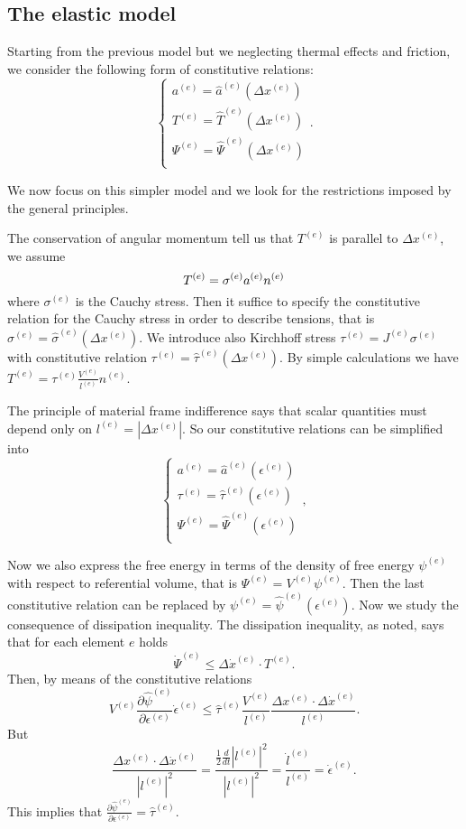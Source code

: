 \documentclass[a4paper,11pt]{article}
\theoremstyle{definition}
\newcommand{\dind}[2]{\frac{\partial #1}{\partial #2}}
\begin{document}
\subsection*{The elastic model}

Starting from the previous model but we neglecting thermal effects and friction, we consider the following form of constitutive relations:
\[
\begin{cases}
a^{(e)}=\hat{a}^{(e)}(\Delta x^{(e)}) \\
T^{(e)}=\hat{T}^{(e)}(\Delta x^{(e)}) \\
\Psi^{(e)}=\hat{\Psi}^{(e)}(\Delta x^{(e)}) \\
\end{cases}.
\]

We now focus on this simpler model and we look for the restrictions imposed by the general principles. 

The conservation of angular momentum tell us that $T^{(e)}$ is parallel to $\Delta x^{(e)}$, we assume
\[
T^{(e)}=\sigma^{(e)}a^{(e)}n^{(e)} \\
\]
where $\sigma^{(e)}$ is the Cauchy stress. Then it suffice to specify the constitutive relation for the Cauchy stress in order to describe tensions, that is $\sigma^{(e)}=\hat{\sigma}^{(e)}(\Delta x^{(e)})$. We introduce also Kirchhoff stress $\tau^{(e)}=J^{(e)}\sigma^{(e)}$ with constitutive relation $\tau^{(e)}=\hat{\tau}^{(e)}(\Delta x^{(e)})$. By simple calculations we have $T^{(e)}=\tau^{(e)}\frac{V^{(e)}}{l^{(e)}}n^{(e)}$.

The principle of material frame indifference says that scalar quantities must depend only on $l^{(e)}=|\Delta x^{(e)}|$. So our constitutive relations can be simplified into
\[
\begin{cases}
a^{(e)}=\hat{a}^{(e)}(\epsilon^{(e)}) \\
\tau^{(e)}=\hat{\tau}^{(e)}(\epsilon^{(e)}) \\
\Psi^{(e)}=\hat{\Psi}^{(e)}(\epsilon^{(e)}) \\
\end{cases},
\]

Now we also express the free energy in terms of the density of free energy $\psi^{(e)}$ with respect to referential volume, that is $\Psi^{(e)}=V^{(e)}\psi^{(e)}$. Then the last constitutive relation can be replaced by $\psi^{(e)}=\hat{\psi}^{(e)}(\epsilon^{(e)})$. Now we study the consequence of dissipation inequality. The dissipation inequality, as noted, says that for each element $e$ holds
\[
\dot{\Psi}^{(e)}\le\Delta \dot{x}^{(e)}\cdot T^{(e)}.
\]
Then, by means of the constitutive relations
\[
V^{(e)}\dind{\hat{\psi}^{(e)}}{\epsilon^{(e)}}\dot{\epsilon}^{(e)}\le\hat{\tau}^{(e)}\frac{V^{(e)}}{l^{(e)}}\frac{\Delta x^{(e)}\cdot\Delta\dot{x}^{(e)}}{l^{(e)}}.
\]
But
\[
\frac{\Delta x^{(e)}\cdot\Delta\dot{x}^{(e)}}{|l^{(e)}|^2}=\frac{\frac{1}{2}\frac{d}{dt}|l^{(e)}|^2}{|l^{(e)}|^2}=\frac{\dot{l}^{(e)}}{l^{(e)}}=\dot{\epsilon}^{(e)}.
\]
This implies that $\dind{\hat{\psi}^{(e)}}{\epsilon^{(e)}}=\hat{\tau}^{(e)}$.
\end{document}
